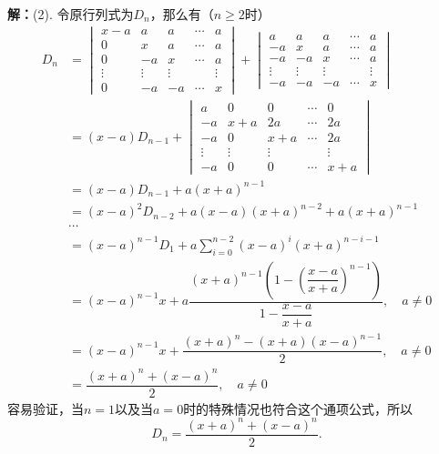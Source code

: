 {\bf 解：}(2). 令原行列式为$D_n$，那么有（$n\geqslant 2$时）
\begin{align*}
D_n & = \begin{vmatrix} x-a & a & a & \cdots & a \\ 0 & x & a & \cdots & a \\ 0 & -a & x & \cdots & a \\ \vdots & \vdots & \vdots & & \vdots \\ 0 & -a & -a & \cdots & x \end{vmatrix} + \begin{vmatrix} a & a & a & \cdots & a \\ -a & x & a & \cdots & a \\ -a & -a & x & \cdots & a \\ \vdots & \vdots & \vdots & & \vdots \\ -a & -a & -a & \cdots & x \end{vmatrix} \\
& = (x-a)D_{n-1} + \begin{vmatrix} a & 0 & 0 & \cdots & 0 \\ -a & x+a & 2a & \cdots & 2a \\ -a & 0 & x+a & \cdots & 2a \\ \vdots & \vdots & \vdots & & \vdots \\ -a & 0 & 0 & \cdots & x+a \end{vmatrix} \\
& = (x-a)D_{n-1} + a (x+a)^{n-1} \\
& = (x-a)^2D_{n-2} + a(x-a)(x+a)^{n-2} + a(x+a)^{n-1} \\
& \cdots \\
& = (x-a)^{n-1} D_1 + a\sum\limits_{i=0}^{n-2} (x-a)^i(x+a)^{n-i-1} \\
& = (x-a)^{n-1} x + a\dfrac{(x+a)^{n-1}\left(1 - \left(\dfrac{x-a}{x+a}\right)^{n-1} \right)}{1 - \dfrac{x-a}{x+a}}, \quad a \neq 0 \\
& = (x-a)^{n-1} x + \dfrac{(x+a)^n-(x+a)(x-a)^{n-1}}{2}, \quad a \neq 0 \\
& = \dfrac{(x+a)^n+(x-a)^n}{2}, \quad a \neq 0
\end{align*}
容易验证，当$n = 1$以及当$a = 0$时的特殊情况也符合这个通项公式，所以
$$D_n = \dfrac{(x+a)^n+(x-a)^n}{2}.$$

